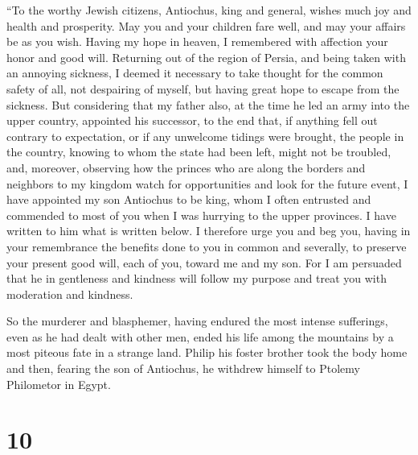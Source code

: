  ``To the worthy Jewish citizens, Antiochus, king and
general, wishes much joy and health and prosperity.  May
you and your children fare well, and may your affairs be as you wish.
Having my hope in heaven,  I remembered with affection
your honor and good will. Returning out of the region of Persia, and
being taken with an annoying sickness, I deemed it necessary to take
thought for the common safety of all,  not despairing of
myself, but having great hope to escape from the sickness.
 But considering that my father also, at the time he led
an army into the upper country, appointed his successor, 
to the end that, if anything fell out contrary to expectation, or if any
unwelcome tidings were brought, the people in the country, knowing to
whom the state had been left, might not be troubled, 
and, moreover, observing how the princes who are along the borders and
neighbors to my kingdom watch for opportunities and look for the future
event, I have appointed my son Antiochus to be king, whom I often
entrusted and commended to most of you when I was hurrying to the upper
provinces. I have written to him what is written below. 
I therefore urge you and beg you, having in your remembrance the
benefits done to you in common and severally, to preserve your present
good will, each of you, toward me and my son.  For I am
persuaded that he in gentleness and kindness will follow my purpose and
treat you with moderation and kindness.

 So the murderer and blasphemer, having endured the most
intense sufferings, even as he had dealt with other men, ended his life
among the mountains by a most piteous fate in a strange land.
 Philip his foster brother took the body home and then,
fearing the son of Antiochus, he withdrew himself to Ptolemy Philometor
in Egypt.

\hypertarget{section-9}{%
\section{10}\label{section-9}}


